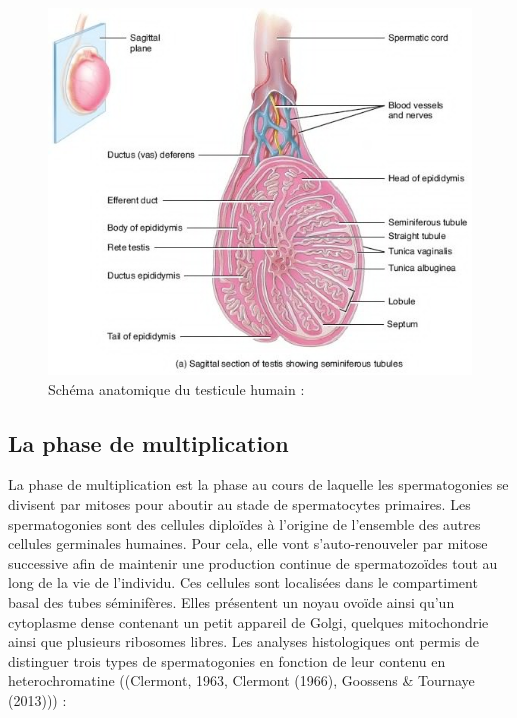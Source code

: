 \documentclass[12pt,twoside]{reedthesis}
\theoremstyle{definition}
\theoremstyle{definition}
\theoremstyle{remark}
\begin{document}
  \begin{figure}
  
  {\centering \includegraphics[scale=0.65]{figure/coupe_testicule2} 
  
  }
  
  \caption{Schéma anatomique du testicule humain : }\label{fig:testicule}
  \end{figure}
  
  \subsection{La phase de
  multiplication}\label{la-phase-de-multiplication}
  
  La phase de multiplication est la phase au cours de laquelle les
  spermatogonies se divisent par mitoses pour aboutir au stade de
  spermatocytes primaires. Les spermatogonies sont des cellules diploïdes
  à l'origine de l'ensemble des autres cellules germinales humaines. Pour
  cela, elle vont s'auto-renouveler par mitose successive afin de
  maintenir une production continue de spermatozoïdes tout au long de la
  vie de l'individu. Ces cellules sont localisées dans le compartiment
  basal des tubes séminifères. Elles présentent un noyau ovoïde ainsi
  qu'un cytoplasme dense contenant un petit appareil de Golgi, quelques
  mitochondrie ainsi que plusieurs ribosomes libres. Les analyses
  histologiques ont permis de distinguer trois types de spermatogonies en
  fonction de leur contenu en heterochromatine ((Clermont, 1963, Clermont
  (1966), Goossens \& Tournaye (2013))) :
  
\end{document}
